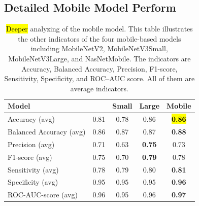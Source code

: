 \documentclass[sensors,article,accept,pdftex,moreauthors]{Definitions/mdpi}
\begin{document}
		\subsection[\appendixname~\thesection]{Detailed Mobile Model Perform}
		\begin{table}[H]
\caption{\hl{Deeper%
} analyzing of the mobile model. This table illustrates the other indicators of the four mobile-based models including MobileNetV2, MobileNetV3Small, MobileNetV3Large, and NasNetMobile. The indicators are Accuracy, Balanced Accuracy, Precision, F1-score, Sensitivity, Specificity, and ROC--AUC score. All of them are average indicators.}
\label{appendix-table:mobile-performance}
\setlength{\tabcolsep}{4.7mm}\begin{tabular}{l  c  c  c  c} 
	\toprule
	\textbf{Model} & \textbf{\cite{04381}} & \textbf{\cite{02244} Small} & \textbf{\cite{02244} Large} & \textbf{\cite{07012} Mobile}\\
	\midrule
	Accuracy (avg) & 0.81 & 0.78 & 0.86 & \textbf{\hl{0.86}}\\
	\midrule
	Balanced Accuracy (avg) & 0.86 & 0.87 & 0.87 & \textbf{0.88}\\ 
	\midrule
	Precision (avg) & 0.71 & 0.63 & \textbf{0.75} & 0.73\\
	\midrule
	F1-score (avg) & 0.75 & 0.70 & \textbf{0.79} & 0.78\\
	\midrule
	Sensitivity (avg) & 0.78 & 0.79 & 0.80 & \textbf{0.81}\\ 
	\midrule
	Specificity (avg) & 0.95 & 0.95 & 0.95 & \textbf{0.96}\\
	\midrule
	ROC-AUC-score (avg) & 0.96 & 0.95 & 0.96 & \textbf{0.97}\\
	\bottomrule
\end{tabular}
		\end{table} 
		
\end{document}

